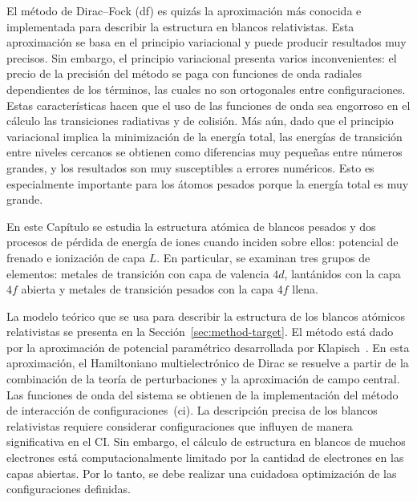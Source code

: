 El método de Dirac--Fock (\acs{df}) es quizás la aproximación más 
conocida e implementada para describir la estructura en blancos 
relativistas. Esta aproximación se basa en el principio variacional y 
puede producir resultados muy precisos. Sin embargo, el principio 
variacional presenta varios inconvenientes: el precio de la precisión 
del método se paga con funciones de onda radiales dependientes de los 
términos, las cuales no son ortogonales entre configuraciones. Estas 
características hacen que el uso de las funciones de onda sea engorroso 
en el cálculo las transiciones radiativas y de colisión. Más aún, dado 
que el principio variacional implica la minimización de la energía 
total, las energías de transición entre niveles cercanos se obtienen 
como diferencias muy pequeñas entre números grandes, y los resultados 
son muy susceptibles a errores numéricos. Esto es especialmente 
importante para los átomos pesados porque la energía total es muy 
grande. 

En este Capítulo se estudia la estructura atómica de blancos pesados
y dos procesos de pérdida de energía de iones cuando inciden sobre 
ellos: potencial de frenado e ionización de capa $L$. En particular, se 
examinan tres grupos de elementos: metales de transición con capa de 
valencia $4d$, lantánidos con la capa $4f$ abierta y metales de 
transición pesados con la capa $4f$ llena. 

La modelo teórico que se usa para describir la estructura de los 
blancos atómicos relativistas se presenta en la 
Sección~\ref{sec:method-target}. El método está dado por la aproximación 
de potencial paramétrico desarrollada por Klapisch~\cite{Klapisch:77,
Klapisch:67,Klapisch:71,BarShalom:01}. En esta aproximación, el 
Hamiltoniano multielectrónico de Dirac se resuelve a partir de la 
combinación de la teoría de perturbaciones y la aproximación de campo 
central. Las funciones de onda del sistema se obtienen de la 
implementación del método de interacción de configuraciones~(\acs{ci}). 
La descripción precisa de los blancos relativistas requiere considerar 
configuraciones que influyen de manera significativa en el CI. Sin 
embargo, el cálculo de estructura en blancos de muchos electrones está 
computacionalmente limitado por la cantidad de electrones en las capas 
abiertas. Por lo tanto, se debe realizar una cuidadosa optimización de 
las configuraciones definidas. 

